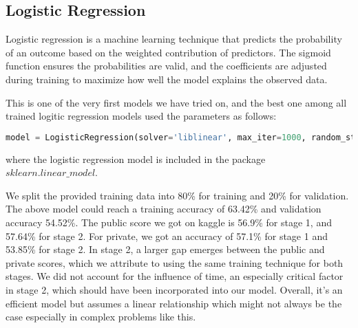 \subsection*{Logistic Regression}

\quad Logistic regression is a machine learning technique that predicts the probability of an outcome based on the weighted contribution of predictors. The sigmoid function ensures the probabilities are valid, and the coefficients are adjusted during training to maximize how well the model explains the observed data. 

This is one of the very first models we have tried on, and the best one among all trained logitic regression models used the parameters as follows: 

\begin{lstlisting}[language=Python]
model = LogisticRegression(solver='liblinear', max_iter=1000, random_state=42)
\end{lstlisting}

where the logistic regression model is included in the package $sklearn.linear\_model$.

We split the provided training data into 80\% for training and 20\% for validation. The above model could reach a training accuracy of 63.42\% and validation accuracy 54.52\%. The public score we got on kaggle is 56.9\% for stage 1, and 57.64\% for stage 2. For private, we got an accuracy of 57.1\% for stage 1 and 53.85\% for stage 2. In stage 2, a larger gap emerges between the public and private scores, which we attribute to using the same training technique for both stages. We did not account for the influence of time, an especially critical factor in stage 2, which should have been incorporated into our model. Overall, it's an efficient model but assumes a linear relationship which might not always be the case especially in complex problems like this.
